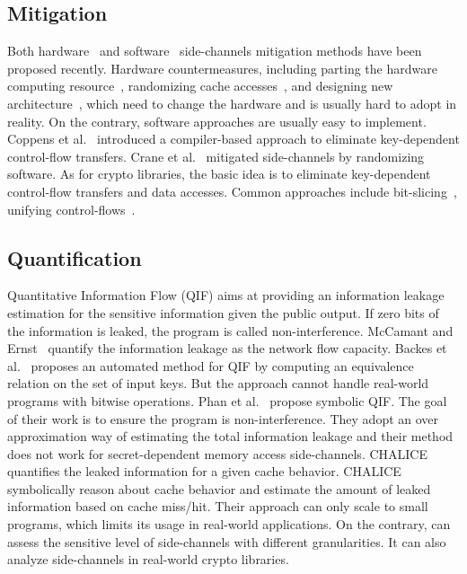 \subsection{Mitigation}
Both hardware~\cite{Page2005PartitionedCA,
Wang:2007:NCD:1250662.1250723,Zhang:2015:HDL:2775054.2694372,Li:2014:SLH:2541940.2541947,
236344} and software~\cite{shih2017t,Coppens:2009:PMT:1607723.1608124,
brickell2006software,crane2015thwarting} side-channels mitigation methods have
been proposed recently. Hardware countermeasures, including parting the hardware
computing resource~\cite{Page2005PartitionedCA}, randomizing cache
accesses~\cite{Wang:2007:NCD:1250662.1250723, 236344}, and designing new
architecture~\cite{tiwari2011crafting}, which need to change the hardware and is
usually hard to adopt in reality. On the contrary, software approaches are
usually easy to implement. Coppens et
al.~\cite{Coppens:2009:PMT:1607723.1608124} introduced a compiler-based approach
to eliminate key-dependent control-flow transfers. Crane et
al.~\cite{crane2015thwarting} mitigated side-channels by randomizing software.
As for crypto libraries, the basic idea is to eliminate key-dependent
control-flow transfers and data accesses. Common approaches include
bit-slicing~\cite{konighofer2008fast,rebeiro2006bitslice}, unifying
control-flows~\cite{Coppens:2009:PMT:1607723.1608124}.

\subsection{Quantification}

Quantitative Information Flow (QIF) aims at providing an information leakage
estimation for the sensitive information given the public output. If zero bits
of the information is leaked, the program is called non-interference. McCamant
and Ernst~\cite{McCamantE2008} quantify the information leakage as the network
flow capacity. Backes et al.~\cite{5207642} proposes an automated method for QIF
by computing an equivalence relation on the set of input keys. But the approach
cannot handle real-world programs with bitwise operations. Phan et
al.~\cite{Phan:2012:SQI:2382756.2382791} propose symbolic QIF. The goal of their
work is to ensure the program is non-interference. They adopt an over
approximation way of estimating the total information leakage and their method
does not work for secret-dependent memory access side-channels.
CHALICE~\cite{Chattopadhyay:2017:QIL:3127041.3127044} quantifies the leaked
information for a given cache behavior. CHALICE symbolically reason about cache
behavior and estimate the amount of leaked information based on cache miss/hit.
Their approach can only scale to small programs, which limits its usage in
real-world applications. On the contrary, \tool{} can assess the sensitive level
of side-channels with different granularities. It can also analyze side-channels
in real-world crypto libraries.



